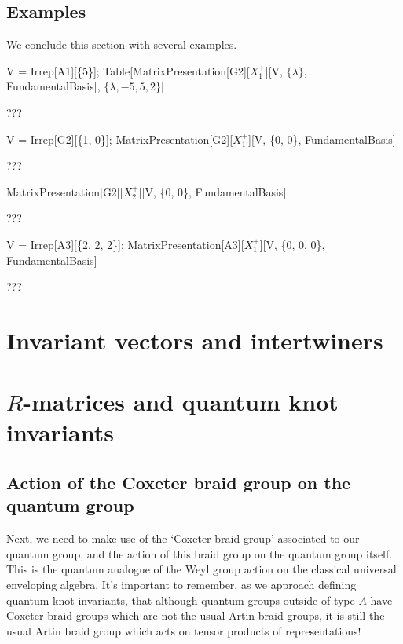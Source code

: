 \subsection{Examples}
We conclude this section with several examples.

\begin{mma}
\begin{inm}V = Irrep[A1][\{5\}];
Table[MatrixPresentation[G2][$X_1^+$][V, $\{\lambda\}$, FundamentalBasis], $\{\lambda, -5, 5, 2\}$]\end{inm}
\begin{outm}???\end{outm}
\begin{inm}V = Irrep[G2][\{1, 0\}];
MatrixPresentation[G2][$X_1^+$][V, \{0, 0\}, FundamentalBasis]\end{inm}
\begin{outm}???\end{outm}
\begin{inm}MatrixPresentation[G2][$X_2^+$][V, \{0, 0\}, FundamentalBasis]\end{inm}
\begin{outm}???\end{outm}
\begin{inm}V = Irrep[A3][\{2, 2, 2\}];
MatrixPresentation[A3][$X_1^+$][V, \{0, 0, 0\}, FundamentalBasis]\end{inm}
\begin{outm}???\end{outm}
\end{mma}


\section{Invariant vectors and intertwiners}


\section{$R$-matrices and quantum knot invariants}
\subsection{Action of the Coxeter braid group on the quantum group}
Next, we need to make use of the `Coxeter braid group' associated to our quantum group, and the action of this braid group on the quantum group itself.
This is the quantum analogue of the Weyl group action on the classical universal enveloping algebra. It's important to remember,
as we approach defining quantum knot invariants, that although quantum groups outside of type $A$ have Coxeter braid groups which are not
the usual Artin braid groups, it is still the usual Artin braid group which acts on tensor products of representations!

